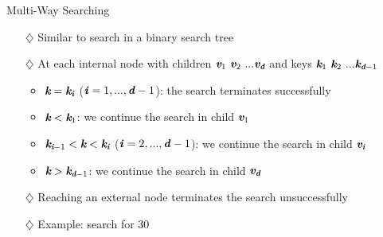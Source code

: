 \documentclass[pdf,
serif,
compress,
xcolor=table,
dvipsnames,
spanish,
aspectratio=169]{beamer}
\begin{document}
\begin{frame} {Multi-Way Searching}
    \begin{itemize} \color{purpura}
        \item[\(\diamondsuit\)] Similar to search in a binary search tree
        \item[\(\diamondsuit\)] At each internal node with children \(\textit{\textbf{v}}_1\ \textit{\textbf{v}}_2\ ... \textit{\textbf{v}}_{\textit{\textbf{d}}}\) and keys \(\textit{\textbf{k}}_1\ \textit{\textbf{k}}_2\ ... \textit{\textbf{k}}_{\textit{\textbf{d}}-1}\)
        \begin{itemize} \color{purpura}
            \item \(\mathbf{\textit{\textbf{k}}} = \textit{\textbf{k}}_{\textit{\textbf{i}}}\) (\(\textbf{\textit{i}} = 1, ..., \textbf{\textit{d}} - 1\)): the search terminates successfully
    
            \item \(\mathbf{\textit{\textbf{k}}} < \textit{\textbf{k}}_1\): we continue the search in child \(\textit{\textbf{v}}_1\)
    
            \item \(\textit{\textbf{k}}_{\textit{\textbf{i}}-1} < \mathbf{\textit{\textbf{k}}} < \textit{\textbf{k}}_{\textit{\textbf{i}}}\) (\(\textbf{\textit{i}} = 2, ..., \textbf{\textit{d}} - 1\)): we continue the search in child \(\textit{\textbf{v}}_{\textit{\textbf{i}}}\)
    
            \item \(\mathbf{\textit{\textbf{k}}} > \textit{\textbf{k}}_{\textit{\textbf{d}}-1}\): we continue the search in child \(\textit{\textbf{v}}_{\textit{\textbf{d}}}\)
        \end{itemize}
        
        \item[\(\diamondsuit\)] Reaching an external node terminates the search unsuccessfully
        \item[\(\diamondsuit\)] Example: search for 30
    \end{itemize}


\end{frame}
\end{document}

